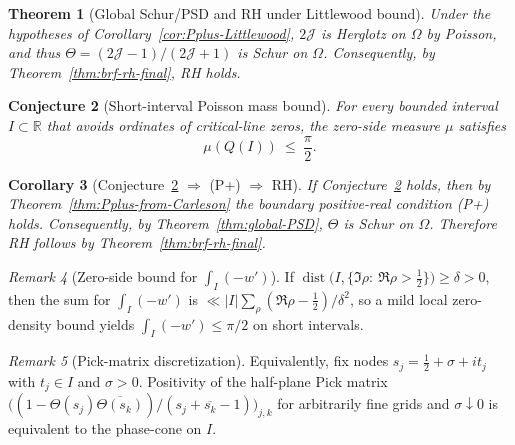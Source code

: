 \documentclass[11pt]{article}
\newtheorem{theorem}{Theorem}
\newtheorem{conjecture}[theorem]{Conjecture}
\newtheorem{corollary}[theorem]{Corollary}
\theoremstyle{definition}
\theoremstyle{remark}
\newtheorem{remark}[theorem]{Remark}
\newcommand{\R}{\mathbb{R}}
\begin{document}
\begin{theorem}[Global Schur/PSD and RH under Littlewood bound]\label{thm:global-RH-Littlewood}
Under the hypotheses of Corollary~\ref{cor:Pplus-Littlewood}, \(2\mathcal J\) is Herglotz on \(\Omega\) by Poisson, and thus \(\Theta=(2\mathcal J-1)/(2\mathcal J+1)\) is Schur on \(\Omega\). Consequently, by Theorem~\ref{thm:brf-rh-final}, RH holds.
\end{theorem}

\begin{conjecture}[Short-interval Poisson mass bound]\label{conj:short-interval-poisson}
For every bounded interval \(I\subset\R\) that avoids ordinates of critical-line zeros, the zero-side measure \(\mu\) satisfies
\[
 \mu(Q(I))\ \le\ \frac{\pi}{2}.
\]
\end{conjecture}

\begin{corollary}[Conjecture~\ref{conj:short-interval-poisson} \(\Rightarrow\) (P+) \(\Rightarrow\) RH]\label{cor:conj-to-RH}
If Conjecture~\ref{conj:short-interval-poisson} holds, then by Theorem~\ref{thm:Pplus-from-Carleson} the boundary positive-real condition \emph{(P+)} holds. Consequently, by Theorem~\ref{thm:global-PSD}, \(\Theta\) is Schur on \(\Omega\). Therefore RH follows by Theorem~\ref{thm:brf-rh-final}.
\end{corollary}
\begin{remark}[Zero-side bound for \(\int_I(-w')\)]
If \(\operatorname{dist}\big(I,\{\Im\rho:\ \Re\rho>\tfrac12\}\big)\ge \delta>0\), then the sum for \(\int_I(-w')\) is \(\ll |I|\sum_{\rho}(\Re\rho-\tfrac12)/\delta^2\), so a mild local zero-density bound yields \(\int_I(-w')\le \pi/2\) on short intervals.
\end{remark}

\begin{remark}[Pick-matrix discretization]\label{rem:pick-certificate}
Equivalently, fix nodes $s_j=\tfrac12+\sigma+i t_j$ with $t_j\in I$ and $\sigma>0$. Positivity of the half-plane Pick matrix \(\big((1-\Theta(s_j)\overline{\Theta(s_k)})/(s_j+\overline{s_k}-1)\big)_{j,k}\) for arbitrarily fine grids and $\sigma\downarrow 0$ is equivalent to the phase-cone on $I$.
\end{remark}
\end{document}
